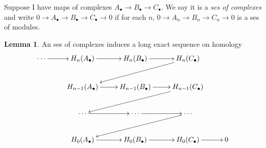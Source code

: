 \documentclass{article}
\theoremstyle{definition}
\newtheorem{lemma}[defn]{Lemma}
\begin{document}
Suppose I have maps of complexes $A_\bullet\rightarrow B_\bullet\rightarrow C_\bullet$. We say it is a \textit{ses of complexes} and write $0\rightarrow A_\bullet\rightarrow B_\bullet\rightarrow C_\bullet\rightarrow 0$ if for each $n$, $0\rightarrow A_n\rightarrow B_n\rightarrow C_n\rightarrow 0$ is a ses of modules.

\begin{lemma}
An ses of complexes induces a long exact sequence on homology
\[
\xymatrix{
\cdots\ar[r] & H_n(A_\bullet) \ar[r] & H_n(B_\bullet)\ar[r] & H_n(C_\bullet) \ar[dll] \\
& H_{n-1}(A_\bullet)\ar[r] & H_{n-1}(B_\bullet)\ar[r] & H_{n-1}(C_\bullet)\ar[dll] \\
& \cdots\ar[r] & \cdots\ar[r] & \cdots\ar[dll] \\
& H_0(A_\bullet)\ar[r] & H_0(B_\bullet)\ar[r] & H_0(C_\bullet)\ar[r] & 0
}
\]
\end{lemma}
\end{document}
